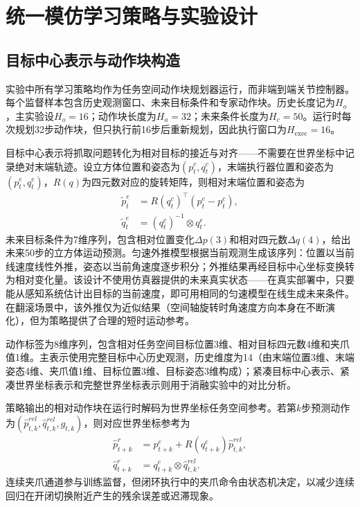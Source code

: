 \chapter{统一模仿学习策略与实验设计}\label{chap:policy-design}

\section{目标中心表示与动作块构造}

实验中所有学习策略均作为任务空间动作块规划器运行，而非端到端关节控制器。每个监督样本包含历史观测窗口、未来目标条件和专家动作块。历史长度记为$H_o$，主实验设$H_o=16$；动作块长度为$H_a=32$；未来条件长度为$H_c=50$。运行时每次规划32步动作块，但只执行前16步后重新规划，因此执行窗口为$H_{\mathrm{exec}}=16$。

目标中心表示将抓取问题转化为相对目标的接近与对齐——不需要在世界坐标中记录绝对末端轨迹。设立方体位置和姿态为$(p^c_t,q^c_t)$，末端执行器位置和姿态为$(p^e_t,q^e_t)$，$R(q)$为四元数对应的旋转矩阵\citep{shoemake1985animating}，则相对末端位置和姿态为
\begin{align}
    \tilde{p}^e_t &= R(q^c_t)^\top(p^e_t-p^c_t),\\
    \tilde{q}^e_t &= (q^c_t)^{-1}\otimes q^e_t .
    \label{eq:target-centric-observation}
\end{align}
未来目标条件为7维序列，包含相对位置变化$\Delta p(3)$和相对四元数$\Delta q(4)$，给出未来50步的立方体运动预测。匀速外推模型根据当前观测生成该序列：位置以当前线速度线性外推，姿态以当前角速度逐步积分；外推结果再经目标中心坐标变换转为相对变化量。该设计不使用仿真器提供的未来真实状态——在真实部署中，只要能从感知系统估计出目标的当前速度，即可用相同的匀速模型在线生成未来条件。在翻滚场景中，该外推仅为近似结果（空间轴旋转时角速度方向本身在不断演化），但为策略提供了合理的短时运动参考。

动作标签为8维序列，包含相对任务空间目标位置3维、相对目标四元数4维和夹爪值1维。主表示使用完整目标中心历史观测，历史维度为14（由末端位置3维、末端姿态4维、夹爪值1维、目标位置3维、目标姿态3维构成）；紧凑目标中心表示、紧凑世界坐标表示和完整世界坐标表示则用于消融实验中的对比分析。

策略输出的相对动作块在运行时解码为世界坐标任务空间参考。若第$k$步预测动作为$(\hat{p}^{rel}_{t,k},\hat{q}^{rel}_{t,k},\hat{g}_{t,k})$，则对应世界坐标参考为
\begin{align}
    \hat{p}^{r}_{t+k} &= p^c_{t+k}+R(q^c_{t+k})\hat{p}^{rel}_{t,k},\\
    \hat{q}^{r}_{t+k} &= q^c_{t+k}\otimes \hat{q}^{rel}_{t,k}.
    \label{eq:relative-action-decode}
\end{align}
连续夹爪通道参与训练监督，但闭环执行中的夹爪命令由状态机决定，以减少连续回归在开闭切换附近产生的残余误差或迟滞现象。

